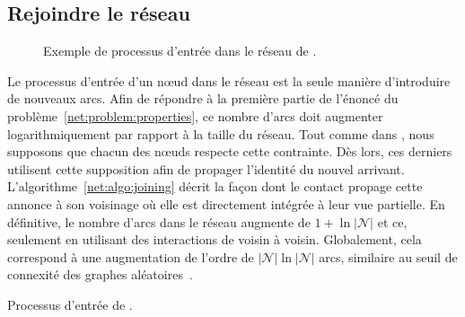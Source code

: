 \subsection{Rejoindre le réseau}
\label{net:subsec:joining}

\begin{figure*}
  \centering
  \hspace{40pt}
  \hspace{10pt}
  \caption[Processus d'entrée dans \SPRAY]
  {\label{net:fig:joiningexample} Exemple de processus d'entrée dans
    le réseau de \SPRAY.}
\end{figure*}

Le processus d'entrée d'un nœud dans le réseau est la seule manière d'introduire
de nouveaux arcs. Afin de répondre à la première partie de l'énoncé du
problème~\ref{net:problem:properties}, ce nombre d'arcs doit augmenter
logarithmiquement par rapport à la taille du réseau. Tout comme dans \SCAMP, nous
supposons que chacun des nœuds respecte cette contrainte. Dès lors, ces derniers
utilisent cette supposition afin de propager l'identité du nouvel
arrivant. L'algorithme~\ref{net:algo:joining} décrit la façon dont le contact
propage cette annonce à son voisinage où elle est directement intégrée à leur
vue partielle. En définitive, le nombre d'arcs dans le réseau augmente de
$1 + \ln |\mathcal{N}|$ et ce, seulement en utilisant des interactions de voisin
à voisin. Globalement, cela correspond à une augmentation de l'ordre de
$|\mathcal{N}| \ln |\mathcal{N}|$ arcs, similaire au seuil de connexité des
graphes aléatoires~\cite{erdos1959random}.

\begin{algorithm}[h]
  
  \caption[Processus d'entrée de \SPRAY] {\label{net:algo:joining}Processus
    d'entrée de \SPRAY.}
\end{algorithm}


